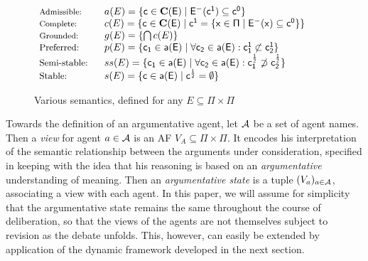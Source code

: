 \documentclass{article}
\newcommand{\proto}{\mathbf C}
\newcommand{\clab}{\sf c}
\begin{document}
\begin{figure}
$\begin{array}{ll}
\text{\footnotesize{Admissible: }} & a(E) = \{\clab \in \proto(E) \mid  E^-(\clab^1) \subseteq \clab^0\} \\
\text{\footnotesize{Complete:}} & c(E) =  \{\clab \in \proto(E) \mid \clab^1 = \{x \in \Pi \mid E^-(x) \subseteq \clab^0\}\} \\
\text{\footnotesize{Grounded:}} & g(E) = \{\bigcap c(E)\} \\
\text{\small{Preferred:}} \ \ & p(E) = \{\clab_1 \in a(E) \mid \forall \clab_2 \in a(E): \clab^1_1 \not \subset \clab^1_2\} \\
\text{\small{Semi-stable:}} \ \ & ss(E) = \{\clab_1 \in a(E) \mid \forall \clab_2 \in a(E): \clab^{\frac{1}{2}}_1 \not \supset \clab^{\frac{1}{2}}_2\} \\
\text{\small{Stable:}} \ \ & s(E) = \{\clab \in a(E) \mid \clab^{\frac{1}{2}} = \emptyset\} 
\end{array}$
\caption{Various semantics, defined for any $E \subseteq \Pi \times \Pi$}
\label{fig:sem}
\end{figure}

Towards the definition of an argumentative agent, let $\mathcal A$ be a set of agent names. Then a \emph{view} for agent $a \in \mathcal A$ is an AF $V_A \subseteq \Pi \times \Pi$. It encodes his interpretation of the semantic relationship between the arguments under consideration, specified in keeping with the idea that his reasoning is based on an \emph{argumentative} understanding of meaning. Then an \emph{argumentative state} is a tuple $(V_a)_{a \in \mathcal A}$, associating a view with each agent. In this paper, we will assume for simplicity that the argumentative state remains the same throughout the course of deliberation, so that the views of the agents are not themselves subject to revision as the debate unfolds. This, however, can easily be extended by application of the dynamic framework developed in the next section.
\end{document}
